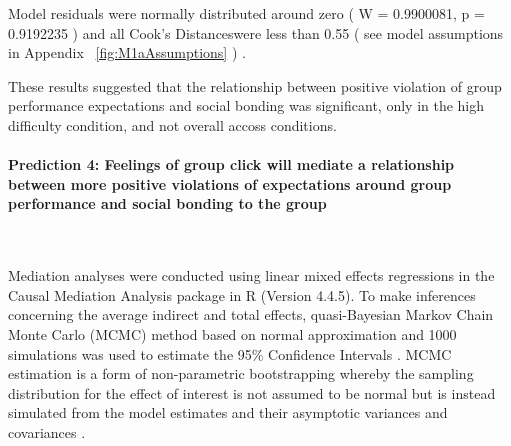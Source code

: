 \documentclass[english]{article}\usepackage[]{graphicx}\usepackage[]{color}
\makeatletter
\newenvironment{kframe}{%
 \def\at@end@of@kframe{}%
 \ifinner\ifhmode%
  \def\at@end@of@kframe{\end{minipage}}%
  \begin{minipage}{\columnwidth}%
 \fi\fi%
 \def\FrameCommand##1{\hskip\@totalleftmargin \hskip-\fboxsep
 \colorbox{shadecolor}{##1}\hskip-\fboxsep
     \hskip-\linewidth \hskip-\@totalleftmargin \hskip\columnwidth}%
 \MakeFramed {\advance\hsize-\width
   \@totalleftmargin\z@ \linewidth\hsize
   \@setminipage}}%
 {\par\unskip\endMakeFramed%
 \at@end@of@kframe}
\newenvironment{knitrout}{}{} %
\newcommand{\myparagraph}[1]{\paragraph{#1}\mbox{}\\}
\newcommand{\pvalue}{p =}
\newcommand{\resdist}{W = }
\newcommand{\cooksD}{Cook's Distances}
\makeatother
\begin{document}
Model residuals were normally distributed around zero
(
  \resdist
    0.9900081,
  \pvalue
    0.9192235
)
and all \cooksD were less than
  0.55
(
see model assumptions in Appendix  ~\ref{fig:M1aAssumptions}
)
.

These results suggested that the relationship between positive violation of group performance expectations and social bonding was significant, only in the high difficulty condition, and not overall accoss conditions.


\myparagraph{Prediction 4: Feelings of group click will mediate a relationship between more positive violations of expectations around group performance and social bonding to the group}

\begin{knitrout}
\color{fgcolor}\begin{kframe}


{\ttfamily\noindent\bfseries{}}

{\ttfamily\noindent\bfseries\color{errorcolor}{\#\# Error in summary(med.out.groupPerfExp): object 'med.out.groupPerfExp' not found}}

{\ttfamily\noindent\bfseries\color{errorcolor}{\#\# Error in summary(med.out.groupPerfExp): object 'med.out.groupPerfExp' not found}}

{\ttfamily\noindent\bfseries\color{errorcolor}{\#\# Error in summary(med.out.groupPerfExp.unclass): object 'med.out.groupPerfExp.unclass' not found}}\end{kframe}
\end{knitrout}
\begin{knitrout}
\color{fgcolor}\begin{kframe}


{\ttfamily\noindent\bfseries{}}\end{kframe}
\end{knitrout}

Mediation analyses were conducted using linear mixed effects regressions in the Causal Mediation Analysis package in R (Version 4.4.5).  To make inferences concerning the average indirect and total effects, quasi-Bayesian Markov Chain Monte Carlo (MCMC) method based on normal approximation and 1000 simulations was used to estimate the 95\% Confidence Intervals \citep{Tofighi2016a,Imai2010}. MCMC estimation is a form of non-parametric bootstrapping whereby the sampling distribution for the effect of interest is not assumed to be normal but is instead simulated from the model estimates and their asymptotic variances and covariances \cite{Preacher2008}.
\end{document}
